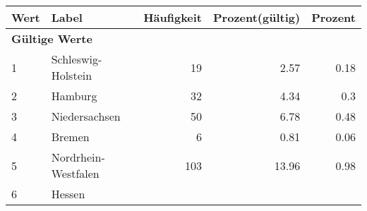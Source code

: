      \begin{longtable}{lXrrr}
     \toprule
     \textbf{Wert} & \textbf{Label} & \textbf{Häufigkeit} & \textbf{Prozent(gültig)} & \textbf{Prozent} \\
     \endhead
     \midrule
     \multicolumn{5}{l}{\textbf{Gültige Werte}}\\

     1 &
     \multicolumn{1}{X}{ Schleswig-Holstein   } &


       \num{19} &
       \num[round-mode=places,round-precision=2]{2.57} &
         \num[round-mode=places,round-precision=2]{0.18} \\

     2 &
     \multicolumn{1}{X}{ Hamburg   } &


       \num{32} &
       \num[round-mode=places,round-precision=2]{4.34} &
         \num[round-mode=places,round-precision=2]{0.3} \\

     3 &
     \multicolumn{1}{X}{ Niedersachsen   } &


       \num{50} &
       \num[round-mode=places,round-precision=2]{6.78} &
         \num[round-mode=places,round-precision=2]{0.48} \\

     4 &
     \multicolumn{1}{X}{ Bremen   } &


       \num{6} &
       \num[round-mode=places,round-precision=2]{0.81} &
         \num[round-mode=places,round-precision=2]{0.06} \\

     5 &
     \multicolumn{1}{X}{ Nordrhein-Westfalen   } &


       \num{103} &
       \num[round-mode=places,round-precision=2]{13.96} &
         \num[round-mode=places,round-precision=2]{0.98} \\

     6 &
     \multicolumn{1}{X}{ Hessen   } &



\end{longtable}
